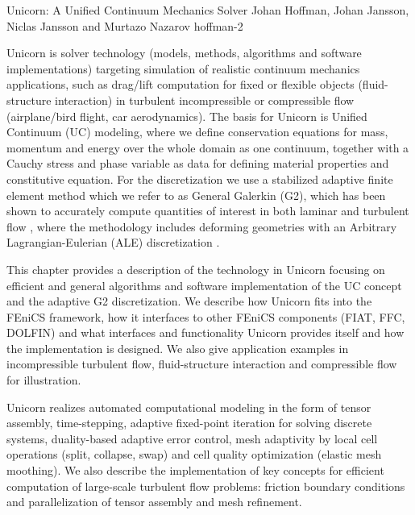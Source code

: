               {Unicorn: A Unified Continuum Mechanics Solver}
              {Johan Hoffman, Johan Jansson, Niclas Jansson and Murtazo Nazarov}
              {hoffman-2}

Unicorn is solver technology (models, methods, algorithms and software
implementations) targeting simulation of realistic continuum mechanics
applications, such as drag/lift computation for fixed or flexible
objects (fluid-structure interaction) in turbulent incompressible or
compressible flow (airplane/bird flight, car aerodynamics). The basis
for Unicorn is Unified Continuum (UC) modeling, where we define
conservation equations for mass, momentum and energy over the whole
domain as one continuum, together with a Cauchy stress and phase
variable as data for defining material properties and constitutive
equation. For the discretization we use a stabilized adaptive finite
element method which we refer to as General Galerkin (G2), which has
been shown to accurately compute quantities of interest in both
laminar and turbulent flow
\cite{ho:siam:bb,hojo:cmame:special,ho:sp,ho:cc,ho:sp,ho:scm}, where
the methodology includes deforming geometries with an Arbitrary
Lagrangian-Eulerian (ALE) discretization \cite{Hoffman_2009,
jjan:fsipre}.

This chapter provides a description of the technology in Unicorn
focusing on efficient and general algorithms and software
implementation of the UC concept and the adaptive G2
discretization. We describe how Unicorn fits into the FEniCS
framework, how it interfaces to other FEniCS components (FIAT, FFC,
DOLFIN) and what interfaces and functionality Unicorn provides itself
and how the implementation is designed. We also give application
examples in incompressible turbulent flow, fluid-structure interaction
and compressible flow for illustration.

Unicorn realizes automated computational modeling in the form of
tensor assembly, time-stepping, adaptive fixed-point iteration for
solving discrete systems, duality-based adaptive error control, mesh
adaptivity by local cell operations (split, collapse, swap) and cell
quality optimization (elastic mesh moothing). We also describe the
implementation of key concepts for efficient computation of
large-scale turbulent flow problems: friction boundary conditions and
parallelization of tensor assembly and mesh refinement.


